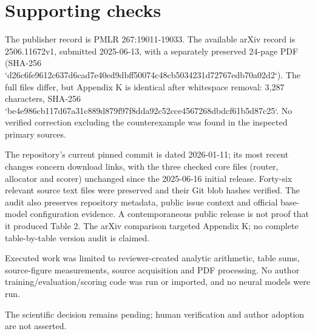 \documentclass[10pt]{article}
\begin{document}
\section*{Supporting checks}
The publisher record is PMLR 267:19011-19033. The available arXiv record is 2506.11672v1, submitted 2025-06-13, with a separately preserved 24-page PDF (SHA-256 `d26c6fe9612c637d6cad7e40ed9dbff50074c48cb5034231d72767edb70a02d2`). The full files differ, but Appendix K is identical after whitespace removal: 3,287 characters, SHA-256 `be4e986cb117d67a31c889d879f97f8dda92c52cce4567268dbdcf61b5d87c25`. No verified correction excluding the counterexample was found in the inspected primary sources.\par
The repository’s current pinned commit is dated 2026-01-11; its most recent changes concern download links, with the three checked core files (router, allocator and scorer) unchanged since the 2025-06-16 initial release. Forty-six relevant source text files were preserved and their Git blob hashes verified. The audit also preserves repository metadata, public issue context and official base-model configuration evidence. A contemporaneous public release is not proof that it produced Table 2. The arXiv comparison targeted Appendix K; no complete table-by-table version audit is claimed.\par
Executed work was limited to reviewer-created analytic arithmetic, table sums, source-figure measurements, source acquisition and PDF processing. No author training/evaluation/scoring code was run or imported, and no neural models were run.\par
The scientific decision remains pending; human verification and author adoption are not asserted.\par
\end{document}
